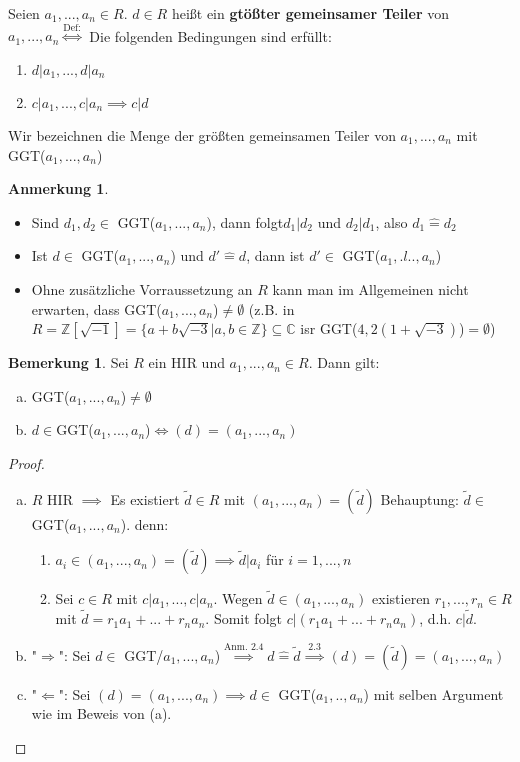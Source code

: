\documentclass[a4paper, titlepage]{article}
\theoremstyle{definition}
\newtheorem{bem}[satz]{Bemerkung}
\newtheorem*{anm}{Anmerkung}
\newcommand{\Z}{\mathbb{Z}}
\newcommand{\C}{\mathbb{C}}
\begin{document}
\begin{definition}
    Seien $a_1,...,a_n\in R$.
    $d\in R$ heißt ein \textbf{gtößter gemeinsamer Teiler} von $a_1,...,a_n \overset{\text{Def:}}{\Leftrightarrow}$ Die folgenden Bedingungen sind erfüllt: 
    \begin{enumerate}[(GGT1)]
        \item $d|a_1,...,d|a_n $
        \item $c|a_1,...,c|a_n \implies c|d$
    \end{enumerate}
    Wir bezeichnen die Menge der größten gemeinsamen Teiler von $a_1,...,a_n$ mit GGT($a_1,...,a_n$)
\end{definition}
\begin{anm}
    \begin{itemize}
        \item Sind $d_1,d_2\in $ GGT($a_1,...,a_n$), dann folgt$d_1|d_2$ und $d_2|d_1$, also $d_1\widehat=d_2$
        \item Ist $d\in$ GGT($a_1,...,a_n$) und $d'\widehat=d$, dann ist $d'\in $ GGT($a_1,.l..,a_n$)
        \item Ohne zusätzliche Vorraussetzung an $R$ kann man im Allgemeinen nicht erwarten, dass GGT($a_1,...,a_n$)$\neq \emptyset$ 
        (z.B. in $R=\Z[\sqrt{-1}]= \{a+b\sqrt{-3}|a,b\in\Z\}\subseteq \C$ isr GGT($4,2(1+\sqrt{-3})$)$=\emptyset$)
    \end{itemize}
        
\end{anm}
\begin{bem}
    Sei $R$ ein HIR und $a_1,...,a_n\in R$. Dann gilt: 
    \begin{enumerate}[(a)]
        \item GGT($a_1,...,a_n$)$\neq \emptyset$
        \item $d\in $GGT($a_1,...,a_n$)$\Leftrightarrow(d)=(a_1,...,a_n)$
    \end{enumerate}
\end{bem}
\begin{proof}
    \begin{enumerate}[(a)]
        \item $R$ HIR $\implies$ Es existiert $\tilde d\in R$ mit $(a_1,...,a_n)=(\tilde d)$
        Behauptung: $\tilde d \in $GGT($a_1,...,a_n$).
        denn: \begin{enumerate}[(GGT1)]
            \item $a_i \in (a_1,...,a_n)=(\tilde d) \implies \tilde d |a_i$ für $i=1,...,n$
            \item Sei $c\in R$ mit $c|a_1,...,c|a_n$. Wegen $\tilde d \in (a_1,...,a_n)$ existieren $r_1,...,r_n\in R $ mit $\tilde d = r_1a_1+...+r_na_n$. Somit folgt $c|(r_1a_1+...+r_na_n)$, d.h. $c|\tilde d$.
        \end{enumerate}
        \item "$\Rightarrow$": Sei $d\in$ GGT/$a_1,...,a_n$)$\overset{\text{Anm. 2.4}}{\implies} d\widehat=\tilde d \overset{2.3}{\implies}(d)=(\tilde d)=(a_1,...,a_n)$
        \item "$\Leftarrow$": Sei $(d)=(a_1,...,a_n)\implies d\in $ GGT($a_1,..,a_n$) mit selben Argument wie im Beweis von (a).
    \end{enumerate}
\end{proof}
\end{document}

